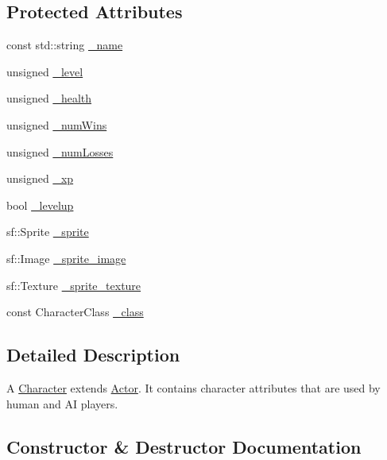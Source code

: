 \subsection*{Protected Attributes}
\begin{DoxyCompactItemize}
\item 
const std\+::string \hyperlink{class_character_aa86be1de1ef615913a552b2134fbb966}{\+\_\+name}
\item 
unsigned \hyperlink{class_character_ab76c68c70f6b8a7dd0d70291cfaeacaf}{\+\_\+level}
\item 
unsigned \hyperlink{class_character_a143e6724430834bf37d93efe4c8d4f98}{\+\_\+health}
\item 
unsigned \hyperlink{class_character_a68d70b5ab4f09cd2a74524fc3d162d3d}{\+\_\+num\+Wins}
\item 
unsigned \hyperlink{class_character_a0f2af69ac7a82ebff650b1a430bb4331}{\+\_\+num\+Losses}
\item 
unsigned \hyperlink{class_character_a1155ad0a6f019df868ce25fb18767c3d}{\+\_\+xp}
\item 
bool \hyperlink{class_character_a7d661e1d0a7631b0c5a2a06ef0165090}{\+\_\+levelup}
\item 
sf\+::\+Sprite \hyperlink{class_character_ab3b89d967b817bc3e199ed70f6b6277a}{\+\_\+sprite}
\item 
sf\+::\+Image \hyperlink{class_character_a1a8bdd55f5f5ec76eabc83c28f0207e4}{\+\_\+sprite\+\_\+image}
\item 
sf\+::\+Texture \hyperlink{class_character_aced7e12300ddeaee16c95850e028b10f}{\+\_\+sprite\+\_\+texture}
\item 
const Character\+Class \hyperlink{class_character_a1027f1708720c0f9bbf0da8c4ae10d97}{\+\_\+class}
\end{DoxyCompactItemize}


\subsection{Detailed Description}
A \hyperlink{class_character}{Character} extends \hyperlink{class_actor}{Actor}. It contains character attributes that are used by human and A\+I players. 

\subsection{Constructor \& Destructor Documentation}
\hypertarget{class_character_a4c236e411ce0bf61200c4d88e36debc5}{}
